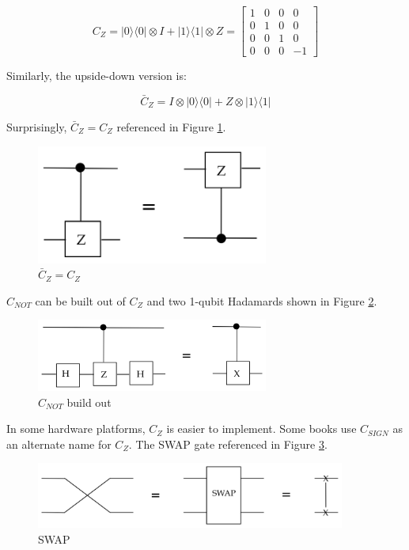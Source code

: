 \documentclass[main.tex]{subfiles}
\begin{document}
    $$
    C_{Z}=|0\rangle\langle 0|\otimes I+| 1\rangle\langle 1| \otimes Z=\left[\begin{array}{cccc}
    1 & 0 & 0 & 0 \\
    0 & 1 & 0 & 0 \\
    0 & 0 & 1 & 0 \\
    0 & 0 & 0 & -1
    \end{array}\right]
    $$
    
    Similarly, the upside-down version is:
    
    $$
    \bar{C}_{Z}=I \otimes|0\rangle\langle 0|+Z \otimes| 1\rangle\langle 1|
    $$
    
    Surprisingly, $\bar{C}_{Z}=C_{Z}$ referenced in Figure \ref{fig:21cz1}.
    
    \begin{figure}
        \centering
        \includegraphics[width=3in]{notes/figs/n08/21cz1.png}
        \caption{$\bar{C}_{Z}=C_{Z}$}
        \label{fig:21cz1}
    \end{figure}
    
    $C_{NOT}$ can be built out of $C_{Z}$ and two 1-qubit Hadamards shown in Figure \ref{fig:22cz2}.
    
    \begin{figure}
        \centering
        \includegraphics[width=3in]{notes/figs/n08/22cz2.png}
        \caption{$C_{NOT}$ build out}
        \label{fig:22cz2}
    \end{figure}
    
    In some hardware platforms, $C_{Z}$ is easier to implement. Some books use $C_{S I G N}$ as an alternate name for $C_{Z}$. The SWAP gate referenced in Figure \ref{fig:23swap}.
    
    \begin{figure}
        \centering
        \includegraphics[width=4in]{notes/figs/n08/23swap.png}
        \caption{SWAP}
        \label{fig:23swap}
    \end{figure}
    
\end{document}
